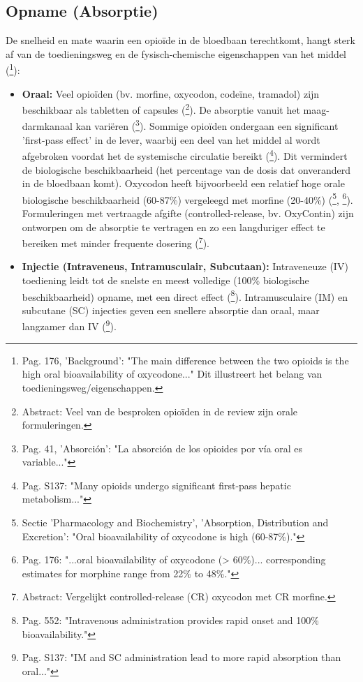 \documentclass[11pt, a4paper]{report} %
\begin{document}
\subsection{Opname (Absorptie)}
De snelheid en mate waarin een opioïde in de bloedbaan terechtkomt, hangt sterk af van de toedieningsweg en de fysisch-chemische eigenschappen van het middel (\cite{Riley2008OxycodoneReview}\footnote{Pag. 176, 'Background': "The main difference between the two opioids is the high oral bioavailability of oxycodone..." Dit illustreert het belang van toedieningsweg/eigenschappen.}):
\begin{itemize}
    \item \textbf{Oraal:} Veel opioïden (bv. morfine, oxycodon, codeïne, tramadol) zijn beschikbaar als tabletten of capsules (\cite{Kalso2004OpioidsChronicNonCancerPain}\footnote{Abstract: Veel van de besproken opioïden in de review zijn orale formuleringen.}). De absorptie vanuit het maag-darmkanaal kan variëren (\cite{SciELO2020Opioids}\footnote{Pag. 41, 'Absorción': "La absorción de los opioides por vía oral es variable..."}). Sommige opioïden ondergaan een significant 'first-pass effect' in de lever, waarbij een deel van het middel al wordt afgebroken voordat het de systemische circulatie bereikt (\cite{Trescot2008OpioidPharm}\footnote{Pag. S137: "Many opioids undergo significant first-pass hepatic metabolism..."}). Dit vermindert de biologische beschikbaarheid (het percentage van de dosis dat onveranderd in de bloedbaan komt). Oxycodon heeft bijvoorbeeld een relatief hoge orale biologische beschikbaarheid (60-87\%) vergeleegd met morfine (20-40\%) (\cite{PubChemOxycodone}\footnote{Sectie 'Pharmacology and Biochemistry', 'Absorption, Distribution and Excretion': "Oral bioavailability of oxycodone is high (60-87\%)." }, \cite{Riley2008OxycodoneReview}\footnote{Pag. 176: "...oral bioavailability of oxycodone (> 60\%)... corresponding estimates for morphine range from 22\% to 48\%."}). Formuleringen met vertraagde afgifte (controlled-release, bv. OxyContin) zijn ontworpen om de absorptie te vertragen en zo een langduriger effect te bereiken met minder frequente dosering (\cite{MucciLoRusso1998CRoxycodoneVsCRmorphine}\footnote{Abstract: Vergelijkt controlled-release (CR) oxycodon met CR morfine.}).
    \item \textbf{Injectie (Intraveneus, Intramusculair, Subcutaan):} Intraveneuze (IV) toediening leidt tot de snelste en meest volledige (100\% biologische beschikbaarheid) opname, met een direct effect (\cite{GutsteinAkil2006OpioidAnalgesics}\footnote{Pag. 552: "Intravenous administration provides rapid onset and 100\% bioavailability."}). Intramusculaire (IM) en subcutane (SC) injecties geven een snellere absorptie dan oraal, maar langzamer dan IV (\cite{Trescot2008OpioidPharm}\footnote{Pag. S137: "IM and SC administration lead to more rapid absorption than oral..."}).

\end{itemize}
\end{document}
